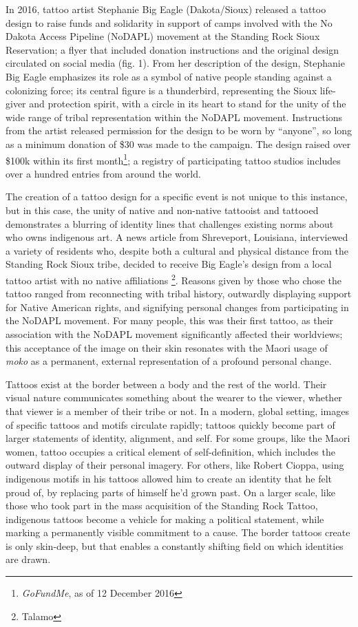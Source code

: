 In 2016, tattoo artist Stephanie Big Eagle (Dakota/Sioux) released a tattoo
design to raise funds and solidarity in support of camps involved with the No
Dakota Access Pipeline (NoDAPL) movement at the Standing Rock Sioux Reservation;
a flyer that included donation instructions and the original design circulated
on social media (fig. 1). From her description of the design, Stephanie Big
Eagle emphasizes its role as a symbol of native people standing against a
colonizing force; its central figure is a thunderbird, representing the Sioux
life-giver and protection spirit, with a circle in its heart to stand for the
unity of the wide range of tribal representation within the NoDAPL movement.
Instructions from the artist released permission for the design to be worn by
``anyone'', so long as a minimum donation of \$30 was made to the campaign.  The
design raised over \$100k within its first month\footnote{\textit{GoFundMe}, as
of 12 December 2016}; a registry of participating tattoo studios includes over a
hundred entries from around the world.

The creation of a tattoo design for a specific event is not unique to this
instance, but in this case, the unity of native and non-native tattooist and
tattooed demonstrates a blurring of identity lines that challenges existing
norms about who owns indigenous art. A news article from Shreveport, Louisiana,
interviewed a variety of residents who, despite both a cultural and physical
distance from the Standing Rock Sioux tribe, decided to receive Big Eagle's
design from a local tattoo artist with no native affiliations \footnote{Talamo}.
Reasons given by those who chose the tattoo ranged from reconnecting with tribal
history, outwardly displaying support for Native American rights, and signifying
personal changes from participating in the NoDAPL movement. For many people,
this was their first tattoo, as their association with the NoDAPL movement
significantly affected their worldviews; this acceptance of the image on their
skin resonates with the Maori usage of \textit{moko} as a permanent, external
representation of a profound personal change.

Tattoos exist at the border between a body and the rest of the world. Their
visual nature communicates something about the wearer to the viewer, whether
that viewer is a member of their tribe or not. In a modern, global setting,
images of specific tattoos and motifs circulate rapidly; tattoos quickly become
part of larger statements of identity, alignment, and self. For some groups,
like the Maori women, tattoo occupies a critical element of self-definition,
which includes the outward display of their personal imagery. For others, like
Robert Cioppa, using indigenous motifs in his tattoos allowed him to create an
identity that he felt proud of, by replacing parts of himself he'd grown past.
On a larger scale, like those who took part in the mass acquisition of the
Standing Rock Tattoo, indigenous tattoos become a vehicle for making a political
statement, while marking a permanently visible commitment to a cause. The border
tattoos create is only skin-deep, but that enables a constantly shifting field
on which identities are drawn.
